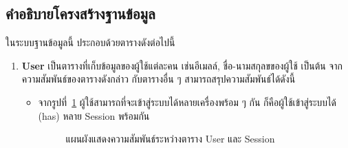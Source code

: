 \documentclass[12pt,oneside,openright,a4paper]{cpe-thai-project}
\begin{document}
    \subsection{คำอธิบายโครงสร้างฐานข้อมูล}
        \begin{flushleft}
            ในระบบฐานข้อมูลนี้ ประกอบด้วยตารางดังต่อไปนี้
        \end{flushleft}
        \begin{enumerate}
            \item \textbf{User}
                เป็นตารางที่เก็บข้อมูลของผู้ใช้แต่ละคน เช่นอีเมลล์, ชื่อ-นามสกุลขของผู้ใช้ เป็นต้น จากความสัมพันธ์ของตารางดังกล่าว กับตารางอื่น ๆ สามารถสรุปความสัมพันธ์ได้ดังนี้
                \begin{itemize}
                    \item จากรูปที่~\ref{fig:db-user-session} ผู้ใช้สามารถที่จะเข้าสู่ระบบได้หลายเครื่องพร้อม ๆ กัน ก็คือผู้ใช้เข้าสู่ระบบได้ (has) หลาย Session พร้อมกัน
                        \begin{figure}[H]
                            \centering 
                            \caption[แผนผังแสดงความสัมพันธ์ระหว่างตาราง User และ Session]{แผนผังแสดงความสัมพันธ์ระหว่างตาราง User และ Session}
                            \label{fig:db-user-session} %
                        \end{figure}
                \end{itemize}
        \end{enumerate}
                        
\end{document}
